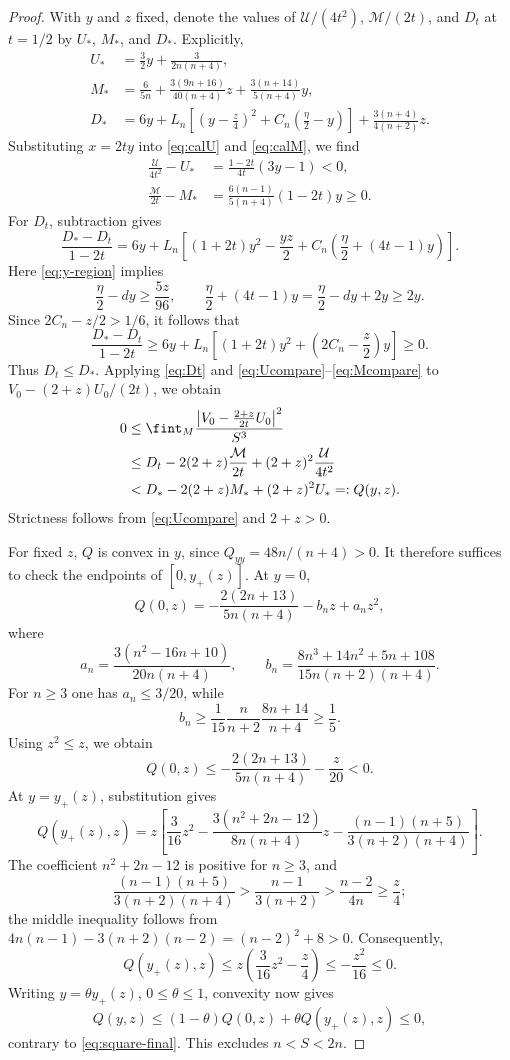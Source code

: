 \documentclass[11pt,reqno]{amsart}
\numberwithin{equation}{section}
\begin{document}
\begin{proof}
With $y$ and $z$ fixed, denote the values of $\mathcal U/(4t^2)$, $\mathcal M/(2t)$, and $D_t$ at $t=1/2$ by $U_*$, $M_*$, and $D_*$. Explicitly,
\begin{align*}
U_*&=\frac32y+\frac{3}{2n(n+4)},\\
M_*&=\frac6{5n}+\frac{3(9n+16)}{40(n+4)}z
+\frac{3(n+14)}{5(n+4)}y,\\
D_*&=6y+L_n\left[\left(y-\frac z4\right)^2
+C_n\left(\frac\eta2-y\right)\right]
+\frac{3(n+4)}{4(n+2)}z.
\end{align*}
Substituting $x=2ty$ into \eqref{eq:calU} and \eqref{eq:calM}, we find
\begin{align}
\frac{\mathcal U}{4t^2}-U_*
&=\frac{1-2t}{4t}(3y-1)<0,\label{eq:Ucompare}\\
\frac{\mathcal M}{2t}-M_*
&=\frac{6(n-1)}{5(n+4)}(1-2t)y\ge0.\label{eq:Mcompare}
\end{align}
For $D_t$, subtraction gives
\[
\frac{D_*-D_t}{1-2t}
=6y+L_n\left[(1+2t)y^2-\frac{yz}{2}
+C_n\left(\frac\eta2+(4t-1)y\right)\right].
\]
Here \eqref{eq:y-region} implies
\[
\frac\eta2-dy\ge\frac{5z}{96},
\qquad
\frac\eta2+(4t-1)y=\frac\eta2-dy+2y\ge2y.
\]
Since $2C_n-z/2>1/6$, it follows that
\[
\frac{D_*-D_t}{1-2t}
\ge6y+L_n\left[(1+2t)y^2+\left(2C_n-\frac z2\right)y\right]\ge0.
\]
Thus $D_t\le D_*$. Applying \eqref{eq:Dt} and \eqref{eq:Ucompare}--\eqref{eq:Mcompare} to $V_0-(2+z)U_0/(2t)$, we obtain
\begin{align}
0&\le\fint_M\frac{\left|V_0-\frac{2+z}{2t}U_0\right|^2}{S^3}\notag\\
&\le D_t-2(2+z)\frac{\mathcal M}{2t}
+(2+z)^2\frac{\mathcal U}{4t^2}\notag\\
&<D_*-2(2+z)M_*+(2+z)^2U_*=:Q(y,z).
\label{eq:square-final}
\end{align}
Strictness follows from \eqref{eq:Ucompare} and $2+z>0$.

For fixed $z$, $Q$ is convex in $y$, since $Q_{yy}=48n/(n+4)>0$. It therefore suffices to check the endpoints of $[0,y_+(z)]$. At $y=0$,
\[
Q(0,z)=-\frac{2(2n+13)}{5n(n+4)}-b_nz+a_nz^2,
\]
where
\[
a_n=\frac{3(n^2-16n+10)}{20n(n+4)},
\qquad
b_n=\frac{8n^3+14n^2+5n+108}{15n(n+2)(n+4)}.
\]
For $n\ge3$ one has $a_n\le3/20$, while
\[
b_n\ge\frac1{15}\frac{n}{n+2}\frac{8n+14}{n+4}\ge\frac15.
\]
Using $z^2\le z$, we obtain
\begin{equation}\label{eq:Q-left-negative}
Q(0,z)\le-\frac{2(2n+13)}{5n(n+4)}-\frac z{20}<0.
\end{equation}
At $y=y_+(z)$, substitution gives
\[
Q(y_+(z),z)
=z\left[\frac3{16}z^2
-\frac{3(n^2+2n-12)}{8n(n+4)}z
-\frac{(n-1)(n+5)}{3(n+2)(n+4)}\right].
\]
The coefficient $n^2+2n-12$ is positive for $n\ge3$, and
\[
\frac{(n-1)(n+5)}{3(n+2)(n+4)}
>\frac{n-1}{3(n+2)}
>\frac{n-2}{4n}\ge\frac z4;
\]
the middle inequality follows from
$4n(n-1)-3(n+2)(n-2)=(n-2)^2+8>0$.
Consequently,
\begin{equation}\label{eq:Q-right-negative}
Q(y_+(z),z)\le z\left(\frac3{16}z^2-\frac z4\right)
\le-\frac{z^2}{16}\le0.
\end{equation}
Writing $y=\theta y_+(z)$, $0\le\theta\le1$, convexity now gives
\[
Q(y,z)\le(1-\theta)Q(0,z)+\theta Q(y_+(z),z)\le0,
\]
contrary to \eqref{eq:square-final}. This excludes $n<S<2n$.


\end{proof}
\end{document}
